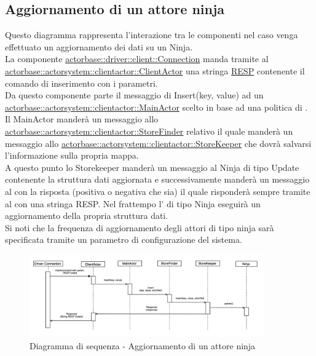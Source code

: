 \documentclass{scalatekids-article}
\begin{document}
\subsection{Aggiornamento di un attore ninja}

Questo diagramma rappresenta l'interazione tra le componenti nel caso venga
effettuato un aggiornamento dei dati su un  Ninja.\\
La componente \hyperref[sec:actorbase::driver::client::Connection]{actorbase::driver::client::Connection}
manda tramite  al \hyperref[sec:actorbase::actorsystem::clientactor::ClientActor]{actorbase::actorsystem::clientactor::ClientActor}
una stringa \hyperref[sec:RESP]{RESP} contenente il comando di inserimento  con
i parametri.\\
Da questo componente parte il messaggio di Insert(key, value) ad un \hyperref[sec:actorbase::actorsystem::clientactor::MainActor]{actorbase::actorsystem::clientactor::MainActor} scelto in base ad una
politica di . Il MainActor manderà un messaggio allo \hyperref[sec:actorbase::actorsystem::clientactor::StoreFinder]{actorbase::actorsystem::clientactor::StoreFinder} relativo il quale manderà un messaggio allo \hyperref[sec:actorbase::actorsystem::clientactor::StoreKeeper]{actorbase::actorsystem::clientactor::StoreKeeper} che dovrà salvarsi l'informazione
sulla propria mappa.\\
A questo punto lo Storekeeper manderà un messaggio al Ninja di tipo Update contenente la struttura dati aggiornata e successivamente manderà un
messaggio al  con la risposta (positiva o negativa che sia)
il quale risponderà sempre tramite  al  con
una stringa RESP.
Nel frattempo l' di tipo Ninja eseguirà un aggiornamento della propria struttura dati.\\
Si noti che la frequenza di aggiornamento degli attori di tipo ninja sarà
specificata tramite un parametro di configurazione del sistema.
\begin{figure}[H]
  \begin{center}
    \includegraphics[width=0.9\textwidth, keepaspectratio]{img/diagrammiSequenza/esempioNinja.png}
    \caption{Diagramma di sequenza - Aggiornamento di un attore ninja}
  \end{center}
\end{figure}
\end{document}
